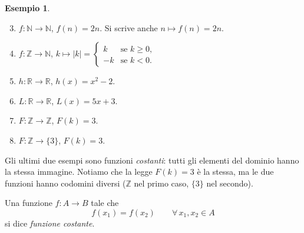 \documentclass[11pt,a4paper]{article}
\theoremstyle{definition}
\newtheorem*{esempio}{Esempio}
\begin{document}
\begin{esempio}
\begin{enumerate}
    \setcounter{enumi}{2}
    \item $f : \mathbb{N} \to \mathbb{N}$, \quad $f(n) = 2n$.
          Si scrive anche $n \mapsto f(n) = 2n$.

    \item $f : \mathbb{Z} \to \mathbb{N}$, \quad
          $k \mapsto |k| =
          \begin{cases}
            k & \text{se } k \geq 0, \\
            -k & \text{se } k < 0.
          \end{cases}$

    \item $h : \mathbb{R} \to \mathbb{R}$, \quad $h(x) = x^2 - 2$.

    \item $L : \mathbb{R} \to \mathbb{R}$, \quad $L(x) = 5x + 3$.

    \item $F : \mathbb{Z} \to \mathbb{Z}$, \quad $F(k) = 3$.

    \item $F : \mathbb{Z} \to \{3\}$, \quad $F(k) = 3$.
\end{enumerate}
\end{esempio}

Gli ultimi due esempi sono funzioni \emph{costanti}: tutti gli elementi del
dominio hanno la stessa immagine. Notiamo che la legge $F(k) = 3$ è la
stessa, ma le due funzioni hanno codomini diversi ($\mathbb{Z}$ nel primo
caso, $\{3\}$ nel secondo).

\begin{definizione}
Una funzione $f : A \to B$ tale che
\[
f(x_1) = f(x_2) \qquad \forall\, x_1, x_2 \in A
\]
si dice \emph{funzione costante}.
\end{definizione}
\end{document}
